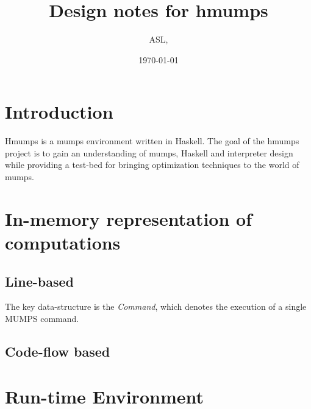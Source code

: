 \documentclass{article}
\title{Design notes for {\sc hmumps}}
\date{\today}
\author{ASL,}
\begin{document}
\maketitle


\section{Introduction}

{\sc Hmumps} is a {\sc mumps} environment written in Haskell.
The goal of the {\sc hmumps} project is to gain an understanding of {\sc mumps}, Haskell and interpreter design while providing a test-bed for bringing optimization techniques to the world of {\sc mumps}.

\section{In-memory representation of computations}

\subsection{Line-based}

The key data-structure is the {\em Command},  which denotes the execution of a single {\sc MUMPS} command.

\subsection{Code-flow based}


\section{Run-time Environment}
\end{document}
